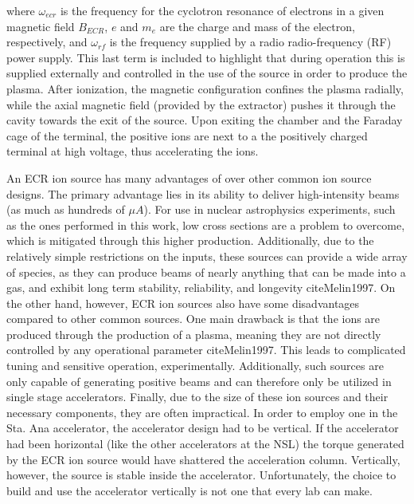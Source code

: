 \noindent where $\omega_{ecr}$ is the frequency for the cyclotron resonance of electrons in a given magnetic field $B_{ECR}$, $e$ and $m_{e}$ are the charge and mass of the electron, respectively, and $\omega_{rf}$ is the frequency supplied by a radio radio-frequency (RF) power supply. This last term is included to highlight that during operation this is supplied externally and controlled in the use of the source in order to produce the plasma. After ionization, the magnetic configuration confines the plasma radially, while the axial magnetic field (provided by the extractor) pushes it through the cavity towards the exit of the source. Upon exiting the chamber and the Faraday cage of the terminal, the positive ions are next to a the positively charged terminal at high voltage, thus accelerating the ions. 

An ECR ion source has many advantages of over other common ion source designs. The primary advantage lies in its ability to deliver high-intensity beams (as much as hundreds of $\mu A$). For use in nuclear astrophysics experiments, such as the ones performed in this work, low cross sections are a problem to overcome, which is mitigated through this higher production. Additionally, due to the relatively simple restrictions on the inputs, these sources can provide a wide array of species, as they can produce beams of nearly anything that can be made into a gas, and exhibit long term stability, reliability, and longevity cite{Melin1997}.  On the other hand, however, ECR ion sources also have some disadvantages compared to other common sources. One main drawback is that the ions are produced through the production of a plasma, meaning they are not directly controlled by any operational parameter cite{Melin1997}. This leads to complicated tuning and sensitive operation, experimentally. Additionally, such sources are only capable of generating positive beams and can therefore only be utilized in single stage accelerators. Finally, due to the size of these ion sources and their necessary components, they are often impractical. In order to employ one in the Sta. Ana accelerator, the accelerator design had to be vertical. If the accelerator had been horizontal (like the other accelerators at the NSL) the torque generated by the ECR ion source would have shattered the acceleration column. Vertically, however, the source is stable inside the accelerator. Unfortunately, the choice to build and use the accelerator vertically is not one that every lab can make. 

